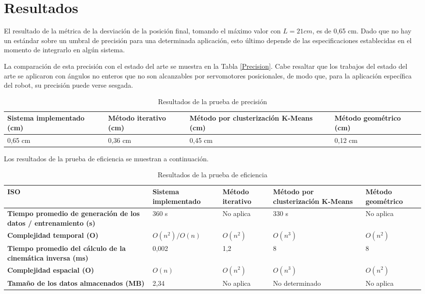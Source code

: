 \section{Resultados}

El resultado de la métrica de la desviación de la posición final, tomando el máximo valor con $L = 21 cm$, es de 0,65 cm. Dado que no hay un estándar sobre un umbral de precisión para una determinada aplicación, esto último depende de las especificaciones establecidas en el momento de integrarlo en algún sistema.

La comparación de esta precisión con el estado del arte se muestra en la Tabla \ref{Precision}. Cabe resaltar que los trabajos del estado del arte se aplicaron con ángulos no enteros que no son alcanzables por servomotores posicionales, de modo que, para la aplicación específica del robot, su precisión puede verse sesgada.

\begin{table}[ht]
	\centering
	\begin{tabular}{p{5cm}p{4cm}p{3.6cm}p{4cm}}
		\hline
		\textbf{Sistema implementado (cm)} & \textbf{Método iterativo (cm)} & \textbf{Método por clusterización K-Means (cm)} & \textbf{Método geométrico (cm)} \\
		\hline
		0,65 cm & 0,36 cm & 0,45 cm & 0,12 cm \\
		\hline
	\end{tabular}
	\caption{Resultados de la prueba de precisión}
	\label{tab:Precision}
\end{table}

Los resultados de la prueba de eficiencia se muestran a continuación.

\begin{table}[ht]
	\centering
	\begin{tabular}{p{3.2cm}p{3.2cm}p{3.2cm}p{3.2cm}p{3.2cm}}
		\hline
	    \textbf{ISO} & \textbf{Sistema implementado} & \textbf{Método iterativo} & \textbf{Método por clusterización K-Means} & \textbf{Método geométrico} \\
		\hline
		\textbf{Tiempo promedio de generación de los datos / entrenamiento (s)} & 360 s & No aplica & 330 s & No aplica \\
		\textbf{Complejidad temporal (O)} & $O(n^2)/O(n)$ & $O(n^2)$ & $O(n^3)$ & $O(n^2)$ \\
		\textbf{Tiempo promedio del cálculo de la cinemática inversa (ms)} & 0,002 & 1,2 & 8 & 8 \\
		\textbf{Complejidad espacial (O)} & $O(n)$ & $O(n^2)$ & $O(n^3)$ & $O(n^2)$ \\
		\textbf{Tamaño de los datos almacenados (MB)} & 2,34 & No aplica & No determinado & No aplica \\
		\hline
	\end{tabular}
	\caption{Resultados de la prueba de eficiencia}
	\label{tab:Eficiencia}
\end{table}
